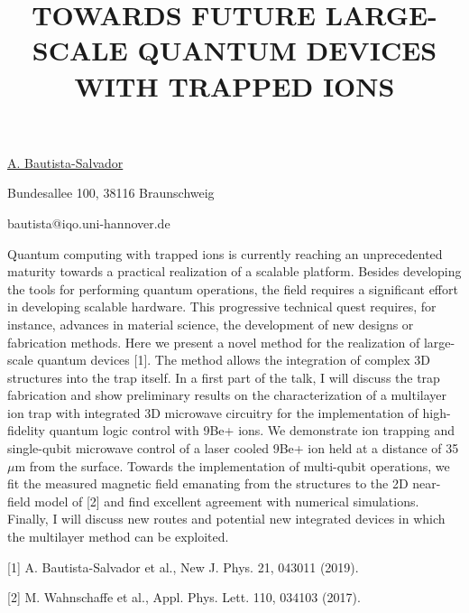 \title{TOWARDS FUTURE LARGE-SCALE QUANTUM DEVICES WITH TRAPPED IONS}

\underline{A. Bautista-Salvador}  

{\normalsize{\vspace{-4mm}
Bundesallee 100, 38116 Braunschweig



\email bautista@iqo.uni-hannover.de}}

Quantum computing with trapped ions is currently reaching an unprecedented maturity towards a practical realization of a scalable platform. Besides developing the tools for performing quantum operations, the field requires a significant effort in developing scalable hardware. This progressive technical quest requires, for instance, advances in material science, the development of new designs or fabrication methods. Here we present a novel method for the realization of large-scale quantum devices [1]. The method allows the integration of complex 3D structures into the trap itself. In a first part of the talk, I will discuss the trap fabrication and show preliminary results on the characterization of a multilayer ion trap with integrated 3D microwave circuitry for the implementation of high-fidelity quantum logic control with 9Be+ ions. We demonstrate ion trapping and single-qubit microwave control of a laser cooled 9Be+ ion held at a distance of 35 $\mu$m from the surface. Towards the implementation of multi-qubit operations, we fit the measured magnetic field emanating from the structures to the 2D near-field model of [2] and find excellent agreement with numerical simulations. Finally, I will discuss new routes and potential new integrated devices in which the multilayer method can be exploited.

{\normalsize
[1] A. Bautista-Salvador et al., New J. Phys. 21, 043011 (2019).
\vsp

[2] M. Wahnschaffe et al., Appl. Phys. Lett. 110, 034103 (2017).
}

\vspace{\baselineskip}